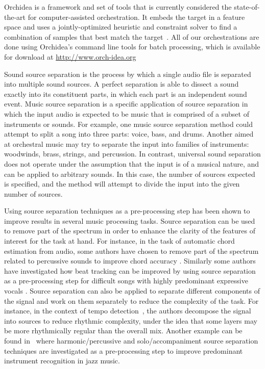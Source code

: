 \documentclass[letterpaper]{article}  %
\begin{document}
  Orchidea is a framework and set of tools that is currently considered the state-of-the-art for computer-assisted orchestration. It embeds the target in a feature space and uses a jointly-optimized heuristic and constraint solver to find a combination of samples that best match the target~\cite{Cella18, Cella2020}. All of our orchestrations are done using Orchidea's command line tools for batch processing, which is available for download at \url{http://www.orch-idea.org}

  Sound source separation is the process by which a single audio file is separated into multiple sound sources. A perfect separation is able to dissect a sound exactly into its constituent parts, in which each part is an independent sound event. Music source separation is a specific application of source separation in which the input audio is expected to be music that is comprised of a subset of instruments or sounds. For example, one music source separation method could attempt to split a song into three parts: voice, bass, and drums. Another aimed at orchestral music may try to separate the input into families of instruments: woodwinds, brass, strings, and percussion. In contrast, universal sound separation does not operate under the assumption that the input is of a musical nature, and can be applied to arbitrary sounds. In this case, the number of sources expected is specified, and the method will attempt to divide the input into the given number of sources.

  Using source separation techniques as a pre-processing step has been shown to improve results in several music processing tasks. Source separation can be used to remove part of the spectrum in order to enhance the clarity of the features of interest for the task at hand. For instance, in the task of automatic chord estimation from audio, some authors have chosen to remove part of the spectrum related to percussive sounds to improve chord accuracy \cite{Reed_al2009}. Similarly some authors have investigated how beat tracking can be improved by using source separation as a pre-processing step for difficult songs with highly predominant expressive vocals \cite{ZapGom2012}. Source separation can also be applied to separate different components of the signal and work on them separately to reduce the complexity of the task. For instance, in the context of tempo detection~\cite{ChoRae2009}, the authors decompose the signal into sources to reduce rhythmic complexity, under the idea that some layers may be more rhythmically regular than the overall mix. Another example can be found in~\cite{GomAbecan2018} where harmonic/percussive and solo/accompaniment source separation techniques are investigated as a pre-processing step to improve predominant instrument recognition in jazz music.
\end{document}
